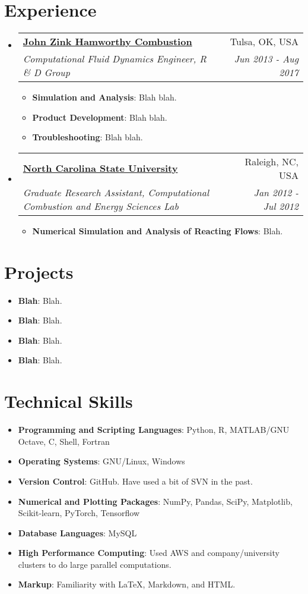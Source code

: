 \documentclass[letterpaper,11pt]{article}
\makeatletter
\newcommand{\resumeItem}[2]{
	\item\small{
		\textbf{#1}{: #2 \vspace{-2pt}}
	}
}
\newcommand{\resumeSubheading}[4]{
	\vspace{-1pt}\item
	\begin{tabular*}{0.97\textwidth}[t]{l@{\extracolsep{\fill}}r}
		\textbf{#1} & #2 \\
		\textit{\small#3} & \textit{\small #4} \\
	\end{tabular*}\vspace{-5pt}
}
\newcommand{\resumeSubItem}[2]{\resumeItem{#1}{#2}\vspace{-4pt}}
\newcommand{\resumeSubHeadingListStart}{\begin{itemize}[leftmargin=*]}
\newcommand{\resumeSubHeadingListEnd}{\end{itemize}}
\newcommand{\resumeItemListStart}{\begin{itemize}}
\newcommand{\resumeItemListEnd}{\end{itemize}\vspace{-5pt}}
\makeatother
\begin{document}
	\section{Experience}
	\resumeSubHeadingListStart
	
	\resumeSubheading
	{\href{https://www.johnzinkhamworthy.com/}{John Zink Hamworthy Combustion}}{Tulsa, OK, USA}
	{Computational Fluid Dynamics Engineer, R \& D Group}{Jun 2013 - Aug 2017}
	\resumeItemListStart
	\resumeItem{Simulation and Analysis}
	{Blah blah.}
	\resumeItem{Product Development}
	{Blah blah.}
	\resumeItem{Troubleshooting}
	{Blah blah.}
	\resumeItemListEnd
	
	\resumeSubheading
	{\href{https://www.mae.ncsu.edu/research/facilities-and-labs/}{North Carolina State University}}{Raleigh, NC, USA}
	{Graduate Research Assistant, Computational Combustion and Energy Sciences Lab}{Jan 2012 - Jul 2012}
	\resumeItemListStart
	\resumeItem{Numerical Simulation and Analysis of Reacting Flows}
	{Blah.}
	\resumeItemListEnd	
	\resumeSubHeadingListEnd
	
	\section{Projects}
	\resumeSubHeadingListStart
	\resumeSubItem{Blah}
	{Blah.}
	\resumeSubItem{Blah}
	{Blah.}
	\resumeSubItem{Blah}
	{Blah.}
	\resumeSubItem{Blah}
	{Blah.}
	\resumeSubHeadingListEnd
	
	\section{Technical Skills}
	\resumeSubHeadingListStart
	\resumeSubItem{Programming and Scripting Languages}
	{Python, R, MATLAB/GNU Octave, C, Shell, Fortran}
	\resumeSubItem{Operating Systems}
	{GNU/Linux, Windows}
	\resumeSubItem{Version Control}
	{GitHub. Have used a bit of SVN in the past.}
	\resumeSubItem{Numerical and Plotting Packages}
	{NumPy, Pandas, SciPy, Matplotlib, Scikit-learn, PyTorch, Tensorflow}
	\resumeSubItem{Database Languages}
	{MySQL}
	\resumeSubItem{High Performance Computing}
	{Used AWS and company/university clusters to do large parallel computations.}
	\resumeSubItem{Markup}
	{Familiarity with \LaTeX, Markdown, and HTML.}
	\resumeSubHeadingListEnd
	
\end{document}
